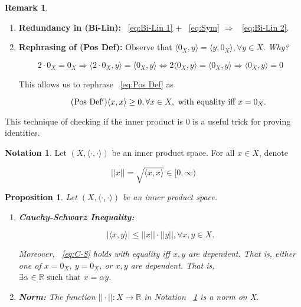 \documentclass[11pt]{amsart}
\newtheorem{proposition}[theorem]{Proposition}
\theoremstyle{definition}
\newtheorem{notation}[theorem]{Notation}
\newtheorem{remark}[theorem]{Remark}
\numberwithin{equation}{section}
\newcommand{\bR}{ \mathbb{R} }	%
\newcommand{\ips}{ \left( X, \langle \cdot, \cdot \rangle \right) }		%
\begin{document}
\begin{remark}\label{rem:12}
\begin{enumerate}

\item \textbf{Redundancy in (Bi-Lin):} ~\ref{eq:Bi-Lin 1} + ~\ref{eq:Sym} $\Rightarrow$ ~\ref{eq:Bi-Lin 2}.

\vspace{6pt}

\item \textbf{Rephrasing of (Pos Def):} Observe that $\langle 0_X, y \rangle = \langle y, 0_X \rangle, \forall y \in X$. \textit{Why?} 

$$2 \cdot 0_X = 0_X \Rightarrow \langle 2 \cdot 0_X, y \rangle = \langle 0_X, y \rangle \Leftrightarrow 2 \langle 0_X, y \rangle = \langle 0_X, y \rangle \Rightarrow  \langle 0_X, y \rangle = 0 $$

This allows us to rephrase ~\ref{eq:Pos Def} as

\[\label{eq:Pos Def prime} \tag{Pos Def$^{\prime}$} \langle x, x \rangle \ge 0, \forall x \in X, \mbox{ with equality iff } x = 0_X.\]
\end{enumerate}

This technique of checking if the inner product is 0 is a useful trick for proving identities. 
\end{remark}

\vspace{6pt}

\begin{notation}\label{not:13}
Let $\ips$ be an inner product space. For all $x \in X$, denote

 $$||x|| = \sqrt{\langle x, x \rangle} \in [0, \infty)$$
\end{notation}

\vspace{6pt}

\begin{proposition}\label{prop:14} Let $\ips$ be an inner product space.

\begin{enumerate}
\vspace{6pt}
\item \textbf{Cauchy-Schwarz Inequality:}

\[\label{eq:C-S} \tag{C-S} | \langle x,y \rangle | \le ||x|| \cdot ||y||, \forall x,y \in X. \]

\vspace{6pt}

Moreover, ~\ref{eq:C-S} holds with equality iff $x,y$ are dependent. That is, either one of $x = 0_X$,  $y = 0_X$, or $x,y$ are dependent. That is, $\exists \alpha \in \bR \mbox{ such that } x = \alpha y$. 

\vspace{6pt}

\item \textbf{Norm:} The function $||\cdot || : X \rightarrow \bR$ in Notation ~\ref{not:13} is a norm on X. 

\end{enumerate}
\end{proposition}
\end{document}
